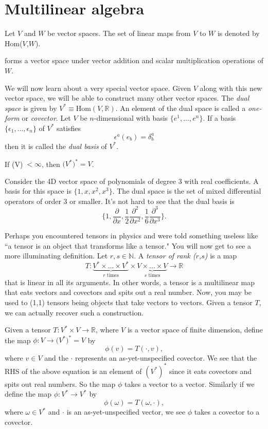 \section{Multilinear algebra}
Let $V$ and $W$ be vector spaces.
The set of linear maps from $V$ to $W$ is denoted by Hom($V$,$W$).
\begin{proposition}{}{}
   forms a vector space under vector addition 
  and scalar multiplication operations of $W$. 
\end{proposition}
We will now learn about a very special vector space. Given $V$ along with
this new vector space, we will be able to construct many other vector spaces.
The {\it dual space} 
is given by $V^*\equiv\text{Hom}(V,\mathbb{R})$.
An element of the dual space is called a {\it one-form} or {\it covector}.
Let $V$ be $n$-dimensional with basis $\{e^1,...,e^n\}$. If a basis
$\{\epsilon_1,...,\epsilon_n\}$ of $V^*$ satisfies
  $$\epsilon^a(e_b)=\delta^a_b$$
then it is called the {\it dual basis} of $V^*$.
\begin{theorem}{}{}
  If (V)$\;<\infty$, then $\big(V^*\big)^*=V$.
\end{theorem}
\begin{example*}{}{}
  Consider the 4D vector space of polynomials of degree 3 with
  real coefficients. A basis for this space is $\{1,x,x^2,x^3\}$. 
  The dual space is the set of mixed differential operators of order 3 or 
  smaller. It's not hard to see that the dual basis is 
  $$\Bigg\{1,\frac{\partial}{\partial x},
             \frac{1}{2}\frac{\partial^2}{\partial x^2},
             \frac{1}{6}\frac{\partial^3}{\partial x^3}\Bigg\}.$$
\end{example*}
Perhaps you encountered tensors in physics and were told something useless
like ``a tensor is an object that transforms like a tensor."
You will now get to see a more illuminating definition.
  Let $r,s\in\mathbb{N}$.
  A {\it tensor of rank ($r$,$s$)} is a map
  $$T:\underbrace{V^*\times...\times V^*}_\text{$r$ times}\times
      \underbrace{V\times...\times V}_\text{$s$ times}\to\mathbb{R}$$
  that is linear in all its arguments.
In other words, a tensor is a multilinear map that eats
vectors and covectors and spits out a real number. Now, you may be used
to (1,1) tensors being objects that take vectors to vectors. Given
a tensor $T$, we can actually recover such a construction.
\begin{example*}{}{}
  Given a tensor $T:V^*\times V\to\mathbb{R}$, where $V$ is a vector space
  of finite dimension, define the map $\phi:V\to \big(V^*\big)^*=V$ by
  $$\phi(v)=T(\cdot,v),$$
  where $v\in V$ and the $\cdot$ represents an as-yet-unspecified covector. 
  We see that the RHS of the above equation is an element of $(V^*)^*$ 
  since it eats covectors and spits out real numbers. So the map $\phi$ takes
  a vector to a vector. Similarly if we 
  define the map $\phi:V^*\to V^*$ by
  $$\phi(\omega)=T(\omega,\cdot),$$
  where $\omega\in V^*$ and $\cdot$ is an as-yet-unspecified vector, we see
  $\phi$ takes a covector to a covector.
\end{example*}
